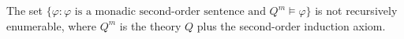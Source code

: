 The set $\{ \varphi : \varphi \text{ is a monadic second-order sentence and } Q^m \models \varphi \}$ is not recursively enumerable, where $Q^m$ is the theory $Q$ plus the second-order induction axiom.

